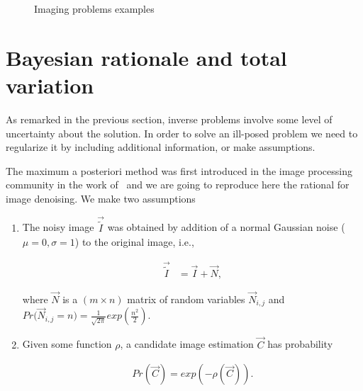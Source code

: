 \begin{figure}
{}\hspace{2em}%
%
\caption{Imaging problems examples}
\label{ch1:fig:imaging-problems-example}
\end{figure}


\section{Bayesian rationale and total variation}
\label{ch1:sec:bayesian-rationale}
As remarked in the previous section, inverse problems involve some level of uncertainty about the solution. In order to solve an ill-posed problem we need to regularize it by including additional information, or make assumptions.

The maximum a posteriori method was first introduced in the image processing community in the work of~\cite{geman84} and we are going to reproduce here the rational for image denoising. We make two assumptions

\begin{enumerate}
	\item{The noisy image $\vec{\widetilde{I}}$ was obtained by addition of a normal Gaussian noise ($\mu=0,\sigma=1$) to the original image, i.e., 
		\begin{assumption}
		\begin{align}
			\vec{\widetilde{I}} &= \vec{I} + \vec{N},
		\label{ch1:denoising-assumption-1}
		\end{align} 
		\end{assumption}
where $\vec{N}$ is a $(m \times n)$ matrix of random variables $\vec{N}_{i,j}$ and $Pr\big( \vec{N}_{i,j} = n \big) = \frac{1}{\sqrt{2\pi}}exp( \frac{n^2}{2} )$.		
	}
	\item{Given some function $\rho$, a candidate image estimation $\vec{C}$ has probability
	
	\begin{assumption}
	\begin{align}
		Pr(\vec{C}) = exp(-\rho(\vec{C})).
		\label{ch1:denoising-assumption-2}
	\end{align}	 
	\end{assumption}
	}
\end{enumerate}

